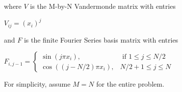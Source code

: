 \documentclass[10pt]{article}
\begin{document}
where $V$ is the M-by-N Vandermonde matrix with entries

\begin{center}
$V_{ij}=(x_i)^j$
\end{center}

and $F$ is the finite Fourier Series basis matrix with entries

\begin{center}
$F_{i, j-1}=\left\{
    \begin{array}{ll}
        \sin \left(j \pi x_{i}\right), & \text { if } 1 \leq j \leq N / 2 \\
        \cos \left((j-N / 2) \pi x_{i}\right), & N / 2+1 \leq j \leq N
    \end{array}
\right.$
\end{center}

For simplicity, assume $M=N$ for the entire problem.
\end{document}
